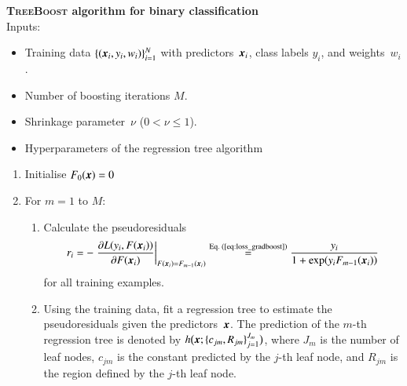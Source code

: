 \vspace{11pt}
\noindent\textbf{\textsc{TreeBoost} algorithm for binary classification} \\[11pt]
Inputs:
\begin{itemize}[itemsep=2pt,topsep=4pt]
\item Training data $\{(\myvec{x}_i, y_i, w_i)\}_{i = 1}^{N}$ with
  predictors~$\myvec{x}_i$, class labels $y_i$, and weights~$w_i$.
\item Number of boosting iterations $M$.
\item Shrinkage parameter~$\nu$ ($0 < \nu \leq 1$).
\item Hyperparameters of the regression tree algorithm
\end{itemize}
\begin{enumerate}[itemsep=4pt,topsep=11pt]

\item Initialise $F_0(\myvec{x}) = 0$

\item For $m = 1$ to $M$:
  \begin{enumerate}[itemsep=4pt]

  \item Calculate the pseudoresiduals
    \begin{align*}
      r_i
      = - \left. \frac{\partial L(y_i, F(\myvec{x}_i))}
      {\partial F(\myvec{x}_i)}\right|_{F(\myvec{x}_i) = F_{m - 1}(\myvec{x}_i)}
      \overset{\text{Eq.\ (\ref{eq:loss_gradboost})}}{=}
      \frac{y_i}{1 + \exp(y_i F_{m-1}(\myvec{x}_i))}
    \end{align*}
    for all training examples.

  \item Using the training data, fit a regression tree to estimate the
    pseudoresiduals given the predictors~$\myvec{x}$. The prediction of the
    $m$-th regression tree is denoted by
    $h\bigl( \myvec{x}; \{c_{jm}, R_{jm}\}_{j=1}^{J_{m}} \bigr)$, where $J_{m}$
    is the number of leaf nodes, $c_{jm}$ is the constant predicted by the
    $j$-th leaf node, and $R_{jm}$ is the region defined by the $j$-th leaf
    node.


\end{enumerate}
\end{enumerate}
